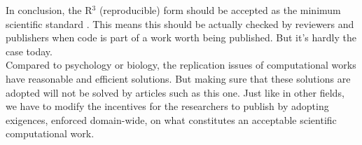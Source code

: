 \documentclass[a4paper,11pt]{article}
\begin{document}
In conclusion, the R$^3$ (reproducible) form should be accepted as the minimum
scientific standard \citep{Wilson:2017}. This means this should be actually
checked by reviewers and publishers when code is part of a work worth being
published. But it's hardly the case today.\\


Compared to psychology or biology, the replication issues of computational works have reasonable and efficient solutions. But making sure that these solutions are adopted will not be solved by articles such as this one. Just like in other fields, we have to modify the incentives for the researchers to publish by adopting exigences, enforced domain-wide, on what constitutes an acceptable scientific computational work.


\renewcommand*{\bibfont}{\small}
\printbibliography[title=References]


\end{document}
